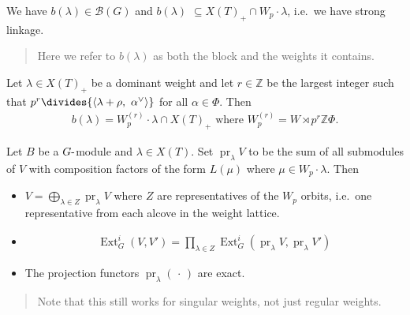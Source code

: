 We have \(b(\lambda) \in \mathcal{B}(G)\) and \(b(\lambda)\)
\(\subseteq X(T)_+ \cap W_p \cdot \lambda\), i.e.~we have strong
linkage.

\begin{quote}
Here we refer to \(b(\lambda)\) as both the block and the weights it
contains.
\end{quote}

\begin{theorem}[Donkin]

Let \(\lambda \in X(T)_+\) be a dominant weight and let
\(r\in {\mathbb{Z}}\) be the largest integer such that
\(p^r \divides {\left\langle { \lambda + \rho},~{\alpha^\vee} \right\rangle}\)
for all \(\alpha\in \Phi\). Then
\begin{align*}
b(\lambda) = W_p^{(r)} \cdot \lambda \cap X(T)_+ \text{ where } W_p^{(r)} = W\rtimes p^r {\mathbb{Z}}\Phi
.\end{align*}

\end{theorem}

\begin{proposition}[?]

Let \(B\) be a \(G{\hbox{-}}\)module and \(\lambda \in X(T)\). Set
\({\operatorname{pr}}_\lambda V\) to be the sum of all submodules of
\(V\) with composition factors of the form \(L(\mu)\) where
\(\mu \in W_p \cdot \lambda\). Then

\begin{itemize}
\item
  \(V = \bigoplus_{\lambda \in Z} {\operatorname{pr}}_\lambda V\) where
  \(Z\) are representatives of the \(W_p\) orbits, i.e.~one
  representative from each alcove in the weight lattice.
\item

  \begin{align*} \operatorname{Ext}_G^i(V, V') = \prod_{\lambda \in Z} \operatorname{Ext}_G^i ({\operatorname{pr}}_\lambda V, {\operatorname{pr}}_\lambda V') \end{align*}
\item
  The projection functors \({\operatorname{pr}}_\lambda({\,\cdot\,})\)
  are exact.
\end{itemize}

\begin{quote}
Note that this still works for singular weights, not just regular
weights.
\end{quote}

\end{proposition}

